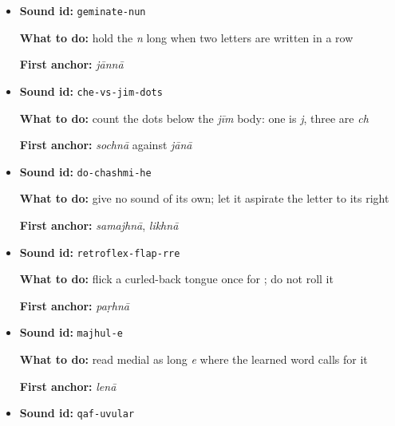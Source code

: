 \begin{itemize}
  \item \begin{minipage}[t]{\linewidth}
  \textbf{Sound id:} \texttt{geminate-nun}
  \par \textbf{What to do:} hold the \emph{n} long when two \textbf{} letters are written in a row
  \par \textbf{First anchor:} \textbf{} \emph{jānnā}
  \end{minipage}
  \item \begin{minipage}[t]{\linewidth}
  \textbf{Sound id:} \texttt{che-vs-jim-dots}
  \par \textbf{What to do:} count the dots below the \emph{jīm} body: one is \textbf{} \emph{j}, three are \textbf{} \emph{ch}
  \par \textbf{First anchor:} \textbf{} \emph{sochnā} against \textbf{} \emph{jānā}
  \end{minipage}
  \item \begin{minipage}[t]{\linewidth}
  \textbf{Sound id:} \texttt{do-chashmi-he}
  \par \textbf{What to do:} give \textbf{} no sound of its own; let it aspirate the letter to its right
  \par \textbf{First anchor:} \textbf{} \emph{samajhnā}, \textbf{} \emph{likhnā}
  \end{minipage}
  \item \begin{minipage}[t]{\linewidth}
  \textbf{Sound id:} \texttt{retroflex-flap-rre}
  \par \textbf{What to do:} flick a curled-back tongue once for \textbf{}; do not roll it
  \par \textbf{First anchor:} \textbf{} \emph{paṛhnā}
  \end{minipage}
  \item \begin{minipage}[t]{\linewidth}
  \textbf{Sound id:} \texttt{majhul-e}
  \par \textbf{What to do:} read medial \textbf{} as long \emph{e} where the learned word calls for it
  \par \textbf{First anchor:} \textbf{} \emph{lenā}
  \end{minipage}
  \item \begin{minipage}[t]{\linewidth}
  \textbf{Sound id:} \texttt{qaf-uvular}

\end{minipage}
\end{itemize}
